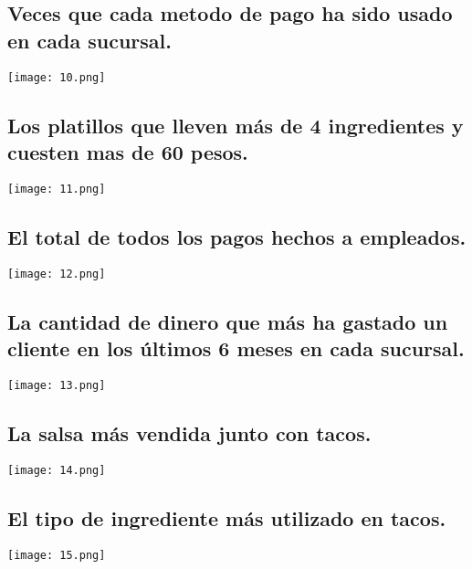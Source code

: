 \documentclass[11pt]{article}
\begin{document}
\subsection{ Veces que cada metodo de pago ha sido usado en cada sucursal.}
\texttt{[image: 10.png]}
\subsection{Los platillos que lleven más de 4 ingredientes y cuesten mas de 60 pesos.}
\texttt{[image: 11.png]}
\subsection{El total de todos los pagos hechos a empleados.}
\texttt{[image: 12.png]}
\subsection{La cantidad de dinero que más ha gastado un cliente en los últimos 6 meses en cada sucursal.}
\texttt{[image: 13.png]}
\subsection{La salsa más vendida junto con tacos.}
\texttt{[image: 14.png]}
\subsection{El tipo de ingrediente más utilizado en tacos.}
\texttt{[image: 15.png]}
\end{document}
